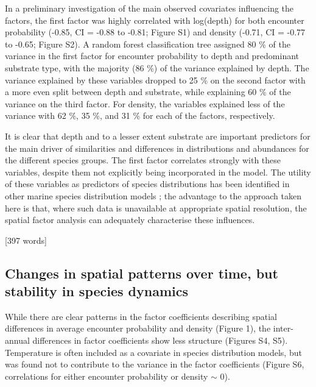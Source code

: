 \documentclass{nature}
\begin{document}
\begin{linenumbers}
In a preliminary investigation of the main observed covariates influencing the factors, the first factor was highly correlated with log(depth) for both encounter
probability (-0.85, CI = -0.88 to -0.81; Figure S1) and density (-0.71, CI =
-0.77 to -0.65; Figure S2). A random forest classification tree assigned 80 \%
of the variance in the first factor for encounter probability to depth and
predominant substrate type, with the majority (86 \%) of the variance explained
by depth. The variance explained by these variables dropped to 25 \% on the
second factor with a more even split between depth and substrate, while
explaining 60 \% of the variance on the third factor.  For density, the
variables explained less of the variance with 62 \%, 35 \%, and 31 \% for each
of the factors, respectively.

It is clear that depth and to a lesser extent substrate are important
predictors for the main driver of similarities and differences in distributions
and abundances for the different species groups. The first factor correlates
strongly with these variables, despite them not explicitly being incorporated
in the model. The utility of these variables as predictors of species
distributions has been identified in other marine species distribution models
\cite{Robinson2011}; the advantage to the approach taken here is that, where
such data is unavailable at appropriate spatial resolution, the spatial factor
analysis can adequately characterise these influences.

[397 words]

\subsection{Changes in spatial patterns over time, but stability in species
	dynamics}

While there are clear patterns in the factor coefficients describing spatial
differences in average encounter probability and density (Figure 1), the inter-annual
differences in factor coefficients show less structure (Figures S4, S5).
Temperature is often included as a covariate in species distribution models,
but was found not to contribute to the variance in the factor coefficients
(Figure S6, correlations for either encounter probability or density $\sim$ 0).


\end{linenumbers}
\end{document}

